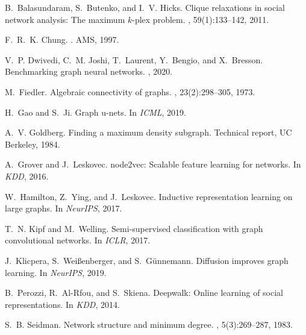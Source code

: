 \documentclass{article} %
\theoremstyle{remark}
\begin{document}
\begin{thebibliography}{}
B.~Balasundaram, S.~Butenko, and I.~V. Hicks.
\newblock Clique relaxations in social network analysis: The maximum
  $k$-plex problem.
, 59(1):133--142, 2011.

F.~R.~K. Chung.
.
\newblock AMS, 1997.

V.~P. Dwivedi, C.~M. Joshi, T.~Laurent, Y.~Bengio, and X.~Bresson.
\newblock Benchmarking graph neural networks.
, 2020.

M.~Fiedler.
\newblock Algebraic connectivity of graphs.
, 23(2):298--305, 1973.

H.~Gao and S.~Ji.
\newblock Graph u-nets.
\newblock In {\em ICML}, 2019.

A.~V. Goldberg.
\newblock Finding a maximum density subgraph.
\newblock Technical report, UC Berkeley, 1984.

A.~Grover and J.~Leskovec.
\newblock node2vec: Scalable feature learning for networks.
\newblock In {\em KDD}, 2016.

W.~Hamilton, Z.~Ying, and J.~Leskovec.
\newblock Inductive representation learning on large graphs.
\newblock In {\em NeurIPS}, 2017.

T.~N. Kipf and M.~Welling.
\newblock Semi-supervised classification with graph convolutional networks.
\newblock In {\em ICLR}, 2017.

J.~Klicpera, S.~Wei{\ss}enberger, and S.~G{\"u}nnemann.
\newblock Diffusion improves graph learning.
\newblock In {\em NeurIPS}, 2019.

B.~Perozzi, R.~Al-Rfou, and S.~Skiena.
\newblock Deepwalk: Online learning of social representations.
\newblock In {\em KDD}, 2014.

S.~B. Seidman.
\newblock Network structure and minimum degree.
, 5(3):269--287, 1983.


\end{thebibliography}
\end{document}
